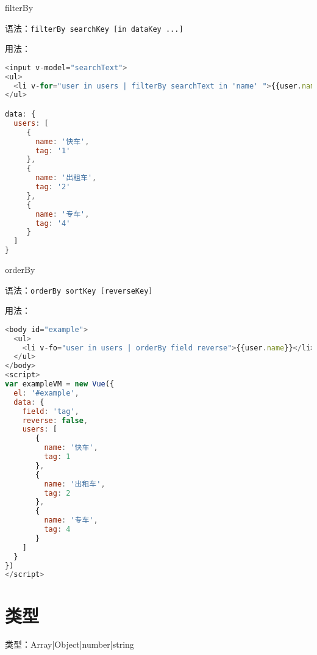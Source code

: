 \begin{compactenum}
\item filterBy

\begin{compactitem}
\item 语法：\texttt{filterBy searchKey [in dataKey ...]}
\item 用法：

\begin{lstlisting}[language=JavaScript]
<input v-model="searchText">
<ul>
  <li v-for="user in users | filterBy searchText in 'name' ">{{user.name}}</li>
</ul>

data: {
  users: [
     {
       name: '快车',
       tag: '1'
     },
     {
       name: '出租车',
       tag: '2'
     },
     {
       name: '专车',
       tag: '4'
     }
  ]
}
\end{lstlisting}

\end{compactitem}

\item orderBy


\begin{compactitem}
\item 语法：\texttt{orderBy sortKey [reverseKey]}
\item 用法：

\begin{lstlisting}[language=JavaScript]
<body id="example">
  <ul>
    <li v-fo="user in users | orderBy field reverse">{{user.name}}</li>
  </ul>
</body>
<script>
var exampleVM = new Vue({
  el: '#example',
  data: {
    field: 'tag',
    reverse: false,
    users: [
       {
         name: '快车',
         tag: 1
       },
       {
         name: '出租车',
         tag: 2
       },
       {
         name: '专车',
         tag: 4
       }
    ]
  }
})
</script>
\end{lstlisting}

\end{compactitem}

\end{compactenum}


\section{类型}

\begin{compactitem}
\item 类型：Array|Object|number|string
\end{compactitem}


